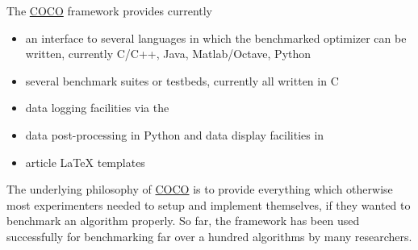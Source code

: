 \documentclass[letterpaper,12pt,english]{article}
\begin{document}
The \href{https://github.com/numbbo/coco}{COCO} framework provides currently
\begin{itemize}
\item {} 
an interface to several languages in which the benchmarked optimizer
can be written, currently C/C++, Java, Matlab/Octave, Python

\item {} 
several benchmark suites or testbeds, currently all written in C

\item {} 
data logging facilities via the 

\item {} 
data post-processing in Python and data display facilities in 

\item {} 
article LaTeX templates

\end{itemize}

The underlying philosophy of \href{https://github.com/numbbo/coco}{COCO} is to provide everything which otherwise
most experimenters needed to setup and implement themselves, if they wanted to
benchmark an algorithm properly. So far, the framework has been used successfully for
benchmarking far over a hundred algorithms by many researchers.
\end{document}
